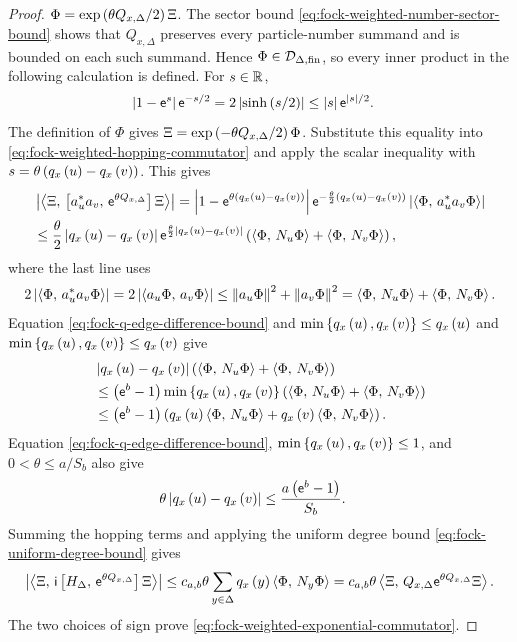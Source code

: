 \documentclass[11pt,a4paper]{article}
\theoremstyle{plain}
\theoremstyle{definition}
\theoremstyle{remark}
\begin{document}
\begin{proof}
$\Phi=\exp \left( \theta Q_{x,\Delta}/2 \right)\Xi$.
The sector bound \eqref{eq:fock-weighted-number-sector-bound} shows that $Q_{x,\Delta}$ preserves every
particle-number summand and is bounded on each such summand.
Hence $\Phi\in\sphilb{D}_{\Delta,\txtfin}$, so every inner product in the following calculation is defined.
For $s\in\mathbb{R}$,
$$\begin{aligned}
\left| 1-\mathsf{e}^s \right|\mathsf{e}^{-s/2}
& =
2\left| \sinh\left( s/2 \right) \right|
\leq
\left| s \right|\mathsf{e}^{\left| s \right|/2}.
\end{aligned}$$
The definition of $\Phi$ gives $\Xi=\exp \left( -\theta Q_{x,\Delta}/2 \right)\Phi$.
Substitute this equality into \eqref{eq:fock-weighted-hopping-commutator} and apply the scalar inequality with
$s
=
\theta\left( q_x \left( u \right)-q_x \left( v \right) \right)$.
This gives
$$\begin{aligned}
&
\left| 
\left\langle \Xi,\,
\left[ a_u^{\ast}a_v,\,\mathsf{e}^{\theta Q_{x,\Delta}} \right]
\Xi \right\rangle \right|
=
\left| 
1-\mathsf{e}^{\theta\left( q_x \left( u \right)-q_x \left( v \right) \right)} \right|
\mathsf{e}^{-\frac{\theta}{2}
\left( q_x \left( u \right)-q_x \left( v \right) \right)}
\left| \left\langle \Phi,\,a_u^{\ast}a_v\Phi \right\rangle \right|
\\
& \leq
\frac{\theta}{2}
\left| q_x \left( u \right)-q_x \left( v \right) \right|
\mathsf{e}^{
\frac{\theta}{2}
\left| q_x \left( u \right)-q_x \left( v \right) \right|}
\left( 
\left\langle \Phi,\,N_u\Phi \right\rangle
+
\left\langle \Phi,\,N_v\Phi \right\rangle \right),
\end{aligned}$$
where the last line uses
$$\begin{aligned}
2\left| \left\langle \Phi,\,a_u^{\ast}a_v\Phi \right\rangle \right|
=
2\left| \left\langle a_u\Phi,\,a_v\Phi \right\rangle \right|
\leq
\left\Vert a_u\Phi \right\Vert^{2}+\left\Vert a_v\Phi \right\Vert^{2}
=
\left\langle \Phi,\,N_u\Phi \right\rangle+\left\langle \Phi,\,N_v\Phi \right\rangle.
\end{aligned}$$
Equation \eqref{eq:fock-q-edge-difference-bound} and
$\min\left\{ q_x \left( u \right),q_x \left( v \right) \right\}\leq q_x \left( u \right)$ and
$\min\left\{ q_x \left( u \right),q_x \left( v \right) \right\}\leq q_x \left( v \right)$ give
$$\begin{aligned}
&
\abs{\fun{q_x}{u}-\fun{q_x}{v}}
\rbk{
\bkt{\Phi}{N_u\Phi}
+
\bkt{\Phi}{N_v\Phi}}
\\ %
&\leq
\rbk{\napiernum^b-1}
\min\setone{\fun{q_x}{u},\fun{q_x}{v}}
\rbk{
\bkt{\Phi}{N_u\Phi}
+
\bkt{\Phi}{N_v\Phi}}
\\
& \leq
\rbk{\napiernum^{b}-1}
\rbk{
\fun{q_x}{u}\bkt{\Phi}{N_u\Phi}
+
\fun{q_x}{v}\bkt{\Phi}{N_v\Phi}}.
\end{aligned}$$
Equation \eqref{eq:fock-q-edge-difference-bound},
$\min\left\{ q_x \left( u \right),q_x \left( v \right) \right\}\leq1$, and $0<\theta\leq a/S_b$ also give
$$\begin{aligned}
\theta\left| q_x \left( u \right)-q_x \left( v \right) \right|
& \leq
\frac{a\left( \mathsf{e}^b-1 \right)}{S_b}.
\end{aligned}$$
Summing the hopping terms and applying the uniform degree bound
\eqref{eq:fock-uniform-degree-bound} gives
$$\begin{aligned}
\abs{
\bkt{\Xi}{
\imunit\commutator{H_{\Delta}}{\napiernum^{\theta Q_{x,\Delta}}}
\Xi}}
\leq
c_{a,b}\theta
\sum_{y\in \Delta}
\fun{q_x}{y}
\bkt{\Phi}{N_y\Phi}
=
c_{a,b}\theta
\bkt{\Xi}{
Q_{x,\Delta}\napiernum^{\theta Q_{x,\Delta}}\Xi}.
\end{aligned}$$
The two choices of sign prove \eqref{eq:fock-weighted-exponential-commutator}.
\end{proof}
\end{document}
